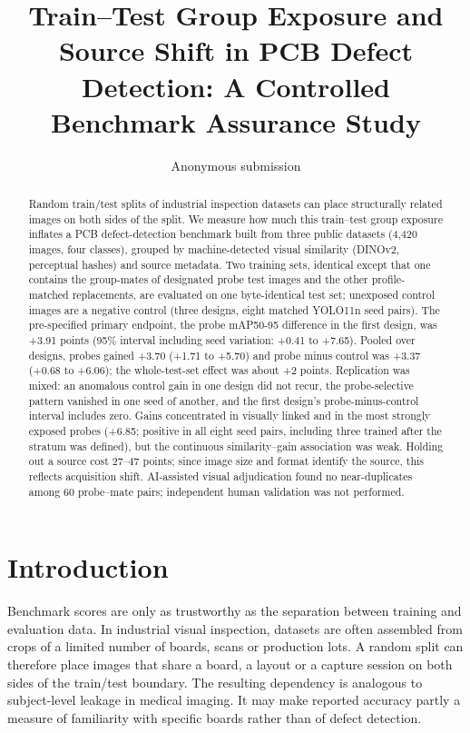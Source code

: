 \documentclass[11pt]{article}
\title{Train--Test Group Exposure and Source Shift in PCB Defect Detection: A Controlled Benchmark Assurance Study}
\author{Anonymous submission}
\date{}
\begin{document}
\maketitle
\begin{abstract}
Random train/test splits of industrial inspection datasets can place structurally related images on both sides of the split. We measure how much this train--test group exposure inflates a PCB defect-detection benchmark built from three public datasets (4,420 images, four classes), grouped by machine-detected visual similarity (DINOv2, perceptual hashes) and source metadata. Two training sets, identical except that one contains the group-mates of designated probe test images and the other profile-matched replacements, are evaluated on one byte-identical test set; unexposed control images are a negative control (three designs, eight matched YOLO11n seed pairs). The pre-specified primary endpoint, the probe mAP50-95 difference in the first design, was +3.91 points (95\% interval including seed variation: +0.41 to +7.65). Pooled over designs, probes gained +3.70 (+1.71 to +5.70) and probe minus control was +3.37 (+0.68 to +6.06); the whole-test-set effect was about +2 points. Replication was mixed: an anomalous control gain in one design did not recur, the probe-selective pattern vanished in one seed of another, and the first design's probe-minus-control interval includes zero. Gains concentrated in visually linked and in the most strongly exposed probes (+6.85; positive in all eight seed pairs, including three trained after the stratum was defined), but the continuous similarity--gain association was weak. Holding out a source cost 27--47 points; since image size and format identify the source, this reflects acquisition shift. AI-assisted visual adjudication found no near-duplicates among 60 probe--mate pairs; independent human validation was not performed.

\end{abstract}
\section{Introduction}
Benchmark scores are only as trustworthy as the separation between training and evaluation data. In industrial visual inspection, datasets are often assembled from crops of a limited number of boards, scans or production lots. A random split can therefore place images that share a board, a layout or a capture session on both sides of the train/test boundary. The resulting dependency is analogous to subject-level leakage in medical imaging. It may make reported accuracy partly a measure of familiarity with specific boards rather than of defect detection.
\end{document}
